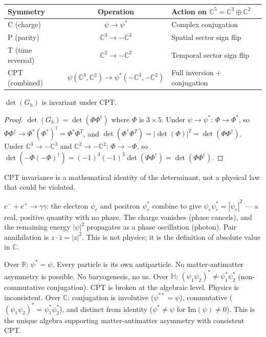 \begin{center}
\begin{tabular}{lcl}
\hline
Symmetry & Operation & Action on $\mathbb{C}^5 = \mathbb{C}^3 \oplus \mathbb{C}^2$ \\
\hline
C (charge) & $\psi \to \psi^*$ & Complex conjugation \\
P (parity) & $\mathbb{C}^3 \to -\mathbb{C}^3$ & Spatial sector sign flip \\
T (time reversal) & $\mathbb{C}^2 \to -\mathbb{C}^2$ & Temporal sector sign flip \\
\hline
CPT (combined) & $\psi(\mathbb{C}^3, \mathbb{C}^2) \to \psi^*(-\mathbb{C}^3, -\mathbb{C}^2)$ & Full inversion + conjugation \\
\hline
\end{tabular}
\end{center}

\begin{theorem}
$\det(G_h)$ is invariant under CPT.
\end{theorem}

\begin{proof}
$\det(G_h) = \det(\Phi\Phi^\dagger)$ where $\Phi$ is $3 \times 5$. Under $\psi \to \psi^*$: $\Phi \to \Phi^*$, so $\Phi\Phi^\dagger \to \Phi^*(\Phi^*)^\dagger = \Phi^*\Phi^T$, and $\det(\Phi^*\Phi^T) = |\det(\Phi)|^2 = \det(\Phi\Phi^\dagger)$. Under $\mathbb{C}^3 \to -\mathbb{C}^3$ and $\mathbb{C}^2 \to -\mathbb{C}^2$: $\Phi \to -\Phi$, so $\det(-\Phi(-\Phi)^\dagger) = (-1)^3(-1)^3\det(\Phi\Phi^\dagger) = \det(\Phi\Phi^\dagger)$.
\end{proof}

CPT invariance is a mathematical identity of the determinant, not a physical law that could be violated.

\begin{remark}[Pair annihilation is $\psi\psi^* = |\psi|^2$]
$e^- + e^+ \to \gamma\gamma$: the electron $\psi_e$ and positron $\psi^*_e$ combine to give $\psi_e \psi^*_e = |\psi_e|^2$ --- a real, positive quantity with no phase. The charge vanishes (phase cancels), and the remaining energy $|\psi|^2$ propagates as a phase oscillation (photon). Pair annihilation is $z \cdot \bar{z} = |z|^2$. This is not physics; it is the definition of absolute value in $\mathbb{C}$.
\end{remark}

\begin{remark}
Over $\mathbb{R}$: $\psi^* = \psi$. Every particle is its own antiparticle. No matter-antimatter asymmetry is possible. No baryogenesis, no us.
Over $\mathbb{H}$: $(\psi_1 \psi_2)^* \neq \psi^*_1 \psi^*_2$ (non-commutative conjugation). CPT is broken at the algebraic level. Physics is inconsistent.
Over $\mathbb{C}$: conjugation is involutive ($\psi^{**} = \psi$), commutative ($(\psi_1\psi_2)^* = \psi^*_1\psi^*_2$), and distinct from identity ($\psi^* \neq \psi$ for $\text{Im}(\psi) \neq 0$). This is the unique algebra supporting matter-antimatter asymmetry with consistent CPT.
\end{remark}

